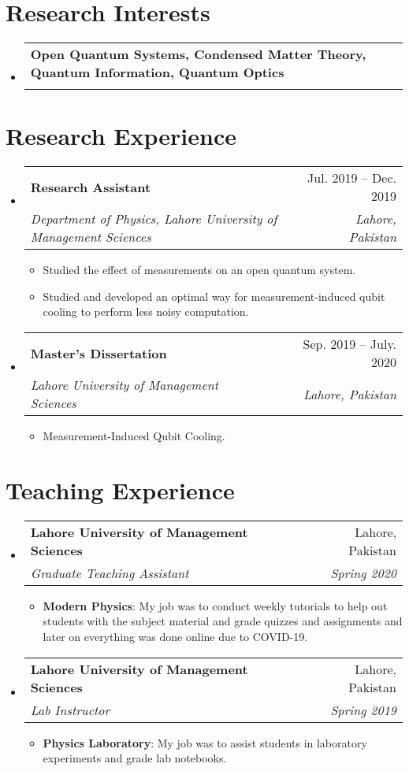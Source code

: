 \documentclass[letterpaper,11pt]{article}
\makeatletter
\newcommand{\resumeItem}[2]{
  \item\small{
    \textbf{#1}{: #2 \vspace{-2pt}}
  }
}
\newcommand{\aff}[2]{
  \item\small{
    {#1}{#2 \vspace{-2pt}}
  }
}
\newcommand{\resumeSubHeadingListStart}{\begin{itemize}[leftmargin=*]}
\newcommand{\resumeSubHeadingListEnd}{\end{itemize}}
\newcommand{\resumeItemListStart}{\begin{itemize}}
\newcommand{\resumeItemListEnd}{\end{itemize}\vspace{-5pt}}
\newcommand{\resumeSubheading}[4]{
  \vspace{-1pt}\item
    \begin{tabular*}{0.97\textwidth}[t]{l@{\extracolsep{\fill}}r}
      \textbf{#1} & #2 \\
      \textit{\small #3} & \textit{\small #4}
    \end{tabular*}\vspace{-5pt}
}
\makeatother
\begin{document}
\section{\textbf{Research Interests}}
        \resumeSubHeadingListStart
    \resumeSubheading
        {\normalfont Open Quantum Systems, Condensed Matter Theory, Quantum Information, Quantum Optics}{}{\normalfont }{}
        \resumeSubHeadingListEnd

\section{\textbf{Research Experience}}
\resumeSubHeadingListStart
    \resumeSubheading
      {Research Assistant}{Jul. 2019 -- Dec. 2019}      
            {Department of Physics, Lahore University of Management Sciences}{Lahore, Pakistan}
        \resumeItemListStart
            \aff{Studied the effect of measurements on an open quantum system.}{}
            \aff{Studied and developed an optimal way for measurement-induced qubit cooling to perform less noisy computation.}{}
            \resumeItemListEnd
    \resumeSubheading
        {Master's Dissertation}{Sep. 2019 -- July. 2020}      
            {Lahore University of Management Sciences}{Lahore, Pakistan}
        \resumeItemListStart
            \aff{\normalfont Measurement-Induced Qubit Cooling.}{}
        \resumeItemListEnd
\resumeSubHeadingListEnd

\section{\textbf{Teaching Experience}}
  \resumeSubHeadingListStart   
    \resumeSubheading
      {Lahore University of Management Sciences}{Lahore, Pakistan}
      {Graduate Teaching Assistant}{Spring 2020}
      \resumeItemListStart
        \resumeItem{Modern Physics}
          {My job was to conduct weekly tutorials to help out students with the subject material and grade quizzes and assignments and later on everything was done online due to COVID-19.}
      \resumeItemListEnd
\resumeSubheading
      {Lahore University of Management Sciences}{Lahore, Pakistan}
      {Lab Instructor}{Spring 2019}
      \resumeItemListStart
        \resumeItem{Physics Laboratory}
          {My job was to assist students in laboratory experiments and grade lab notebooks.}
\resumeItemListEnd
  \resumeSubHeadingListEnd
\end{document}
